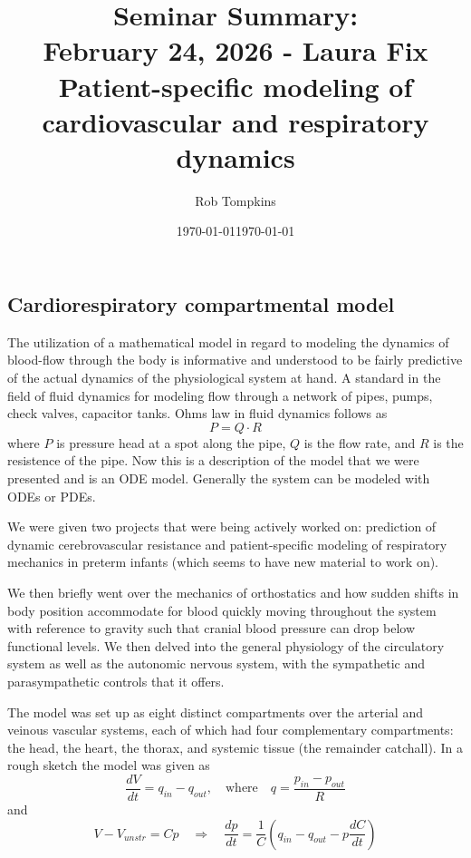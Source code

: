 \documentclass[12pt]{amsart}
\title{Seminar Summary:\\February 24, 2026 - Laura Fix\\Patient-specific modeling of cardiovascular and respiratory dynamics}
\author{Rob Tompkins}
\date{\today}
\theoremstyle{definition}
\theoremstyle{question}
\begin{document}
    \maketitle
    \date{\today}
    \begin{onehalfspace}

        \section{Cardiorespiratory compartmental model}
        The utilization of a mathematical model in regard to modeling the dynamics of blood-flow through the body
        is informative and understood to be fairly predictive of the actual dynamics of the physiological system
        at hand.
        A standard in the field of fluid dynamics for modeling flow through a network of pipes, pumps, check valves,
        capacitor tanks.
        Ohms law in fluid dynamics follows as
        \begin{displaymath}
            P = Q\cdot R
        \end{displaymath}
        where $P$ is pressure head at a spot along the pipe, $Q$ is the flow rate, and $R$ is the resistence of the
        pipe.
        Now this is a description of the model that we were presented and is an ODE model.
        Generally the system can be modeled with ODEs or PDEs.

        We were given two projects that were being actively worked on: prediction of dynamic cerebrovascular resistance and
        patient-specific modeling of respiratory mechanics in preterm infants (which seems to have new material to work on).

        We then briefly went over the mechanics of orthostatics and how sudden shifts in body position accommodate for
        blood quickly moving throughout the system with reference to gravity such that cranial blood pressure can drop
        below functional levels.
        We then delved into the general physiology of the circulatory system as well as the autonomic nervous system,
        with the sympathetic and parasympathetic controls that it offers.

        The model was set up as eight distinct compartments over the arterial and veinous vascular systems,
        each of which had four complementary compartments: the head, the heart, the thorax, and systemic tissue (the
        remainder catchall). In a rough sketch the model was given as
        \begin{displaymath}
                \frac{dV}{dt} = q_{in} - q_{out},\quad\text{where}\quad q = \frac{p_{in} - p_{out}}{R}
        \end{displaymath}
        and
        \begin{displaymath}
            V - V_{unstr} = Cp\quad \Rightarrow\quad \frac{dp}{dt} = \frac{1}{C}\left(q_{in}-q_{out}-p\frac{dC}{dt}\right)
        \end{displaymath}


\end{onehalfspace}
\end{document}
